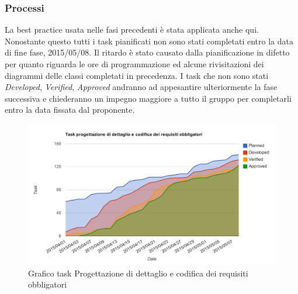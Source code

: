 		\subsubsection{Processi}
		La best practice usata nelle fasi precedenti è stata applicata anche qui. Nonostante questo tutti i task pianificati non sono stati completati entro la data di fine fase, 2015/05/08. Il ritardo è stato causato dalla pianificazione in difetto per quanto riguarda le ore di programmazione ed alcune rivisitazioni dei diagrammi delle classi completati in precedenza. I task che non sono stati \textit{Developed}, \textit{Verified}, \textit{Approved} andranno ad appesantire ulteriormente la fase successiva e chiederanno un impegno maggiore a tutto il gruppo per completarli entro la data fissata dal proponente.		
			\begin{figure}[htbp]
				\centering
				\centerline{\includegraphics[scale=0.7]{images/Grafico_fase_5.pdf}}
				\caption{Grafico task Progettazione di dettaglio e codifica dei requisiti obbligatori}
				\label{fig:taskfase5}
			\end{figure}
			
